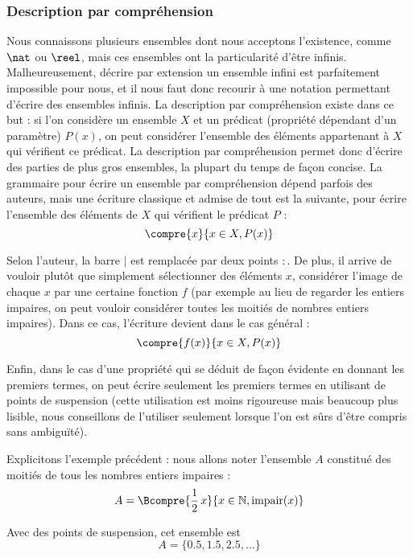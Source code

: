 \subsubsection{Description par compréhension}

Nous connaissons plusieurs ensembles dont nous acceptons l'existence, comme $\nat$ ou $\reel$, mais ces ensembles ont la particularité d'être infinis. Malheureusement, décrire par extension un ensemble infini est parfaitement impossible pour nous, et il nous faut donc recourir à une notation permettant d'écrire des ensembles infinis. La description par compréhension existe dans ce but : si l'on considère un ensemble $X$ et un prédicat (propriété dépendant d'un paramètre) $P(x)$, on peut considérer l'ensemble des éléments appartenant à $X$ qui vérifient ce prédicat. La description par compréhension permet donc d'écrire des parties de plus gros ensembles, la plupart du temps de façon concise. La grammaire pour écrire un ensemble par compréhension dépend parfois des auteurs, mais une écriture classique et admise de tout est la suivante, pour écrire \og l'ensemble des éléments de $X$ qui vérifient le prédicat $P$\fg{} :
$$\compre{x}{x\in X, P(x)}
$$

\begin{rmk}
    Selon l'auteur, la barre $|$ est remplacée par deux points $:$. De plus, il arrive de vouloir plutôt que simplement sélectionner des éléments $x$, considérer l'image de chaque $x$ par une certaine fonction $f$ (par exemple au lieu de regarder les entiers impaires, on peut vouloir considérer toutes les moitiés de nombres entiers impaires). Dans ce cas, l'écriture devient dans le cas général :
    $$\compre{f(x)}{x\in X, P(x)}
    $$
    
    Enfin, dans le cas d'une propriété qui se déduit de façon évidente en donnant les premiers termes, on peut écrire seulement les premiers termes en utilisant de points de suspension (cette utilisation est moins rigoureuse mais beaucoup plus lisible, nous conseillons de l'utiliser seulement lorsque l'on est sûrs d'être compris sans ambiguïté).
\end{rmk}

\begin{expl}
    Explicitons l'exemple précédent : nous allons noter l'ensemble $A$ constitué des moitiés de tous les nombres entiers impaires :
    $$A=\Bcompre{\dfrac{1}{2}\,x}{x\in \mathbb N, \mathrm{impair}(x)}
    $$
    
    Avec des points de suspension, cet ensemble est $$A=\{0.5,1.5,2.5,\ldots\}$$
\end{expl}

